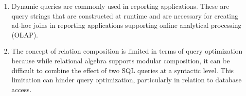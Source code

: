 \documentclass[a4paper,14pt, unknownkeysallowed]{extreport}
\begin{document}
\begin{enumerate}
	\item Dynamic queries are commonly used in reporting applications. These are query strings that are constructed at runtime and are necessary for creating ad-hoc joins in reporting applications supporting online analytical processing (OLAP).
	
	\item The concept of relation composition is limited in terms of query optimization because while relational algebra supports modular composition, it can be difficult to combine the effect of two SQL queries at a syntactic level. This limitation can hinder query optimization, particularly in relation to database access.
\end{enumerate}

	
\end{document}
